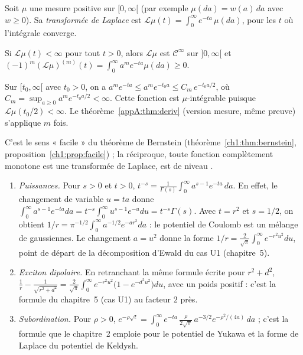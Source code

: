\begin{definition}
Soit $\mu$ une mesure positive sur $[0,\infty[$ (par exemple $\mu(da)=w(a)\,da$ avec $w\ge0$). Sa \emph{transformée de
Laplace} est $\mathcal L\mu(t)=\int_0^\infty e^{-ta}\,\mu(da)$, pour les $t$ où l'intégrale converge.
\end{definition}

\begin{proposition}\label{appA:prop:laplacecm}
Si $\mathcal L\mu(t)<\infty$ pour tout $t>0$, alors $\mathcal L\mu$ est $\mathcal C^\infty$ sur $]0,\infty[$ et
$(-1)^m(\mathcal L\mu)^{(m)}(t)=\int_0^\infty a^me^{-ta}\mu(da)\ge0$.
\end{proposition}

\begin{humanproof}
Sur $[t_0,\infty[$ avec $t_0>0$, on a $a^me^{-ta}\le a^me^{-t_0a}\le C_m\,e^{-t_0a/2}$, où
$C_m=\sup_{a\ge0}a^me^{-t_0a/2}<\infty$. Cette fonction est $\mu$-intégrable puisque $\mathcal L\mu(t_0/2)<\infty$.
Le théorème~\ref{appA:thm:deriv} (version mesure, même preuve) s'applique $m$ fois.
\end{humanproof}
C'est le sens « facile » du théorème de Bernstein (théorème~\ref{ch1:thm:bernstein}, proposition~\ref{ch1:prop:facile}) ;
la réciproque, toute fonction complètement monotone est une transformée de Laplace, est de niveau \tierL.

\begin{example}\label{appA:ex:laplace}
\begin{enumerate}
\item \emph{Puissances.} Pour $s>0$ et $t>0$, $t^{-s}=\frac1{\Gamma(s)}\int_0^\infty a^{s-1}e^{-ta}\,da$. En effet, le
changement de variable $u=ta$ donne $\int_0^\infty a^{s-1}e^{-ta}da=t^{-s}\int_0^\infty u^{s-1}e^{-u}du=t^{-s}\Gamma(s)$.
Avec $t=r^2$ et $s=1/2$, on obtient $1/r=\pi^{-1/2}\int_0^\infty a^{-1/2}e^{-ar^2}da$ : le potentiel de Coulomb est
un mélange de gaussiennes. Le changement $a=u^2$ donne la forme $1/r=\frac2{\sqrt\pi}\int_0^\infty e^{-r^2u^2}du$,
point de départ de la décomposition d'Ewald du cas U1 (chapitre~5).
\item \emph{Exciton dipolaire.} En retranchant la même formule écrite pour $r^2+d^2$,
$\frac1r-\frac1{\sqrt{r^2+d^2}}=\frac2{\sqrt\pi}\int_0^\infty e^{-r^2u^2}\bigl(1-e^{-d^2u^2}\bigr)du$, avec un poids
positif : c'est la formule du chapitre~5 (cas U1) au facteur $2$ près.
\item \emph{Subordination.} Pour $\rho>0$, $e^{-\rho\sqrt t}=\int_0^\infty e^{-ta}\,\frac{\rho}{2\sqrt\pi}\,a^{-3/2}
e^{-\rho^2/(4a)}\,da$ \tierL{} ; c'est la formule que le chapitre~2 emploie pour le potentiel de Yukawa et la
forme de Laplace du potentiel de Keldysh.
\end{enumerate}
\end{example}

